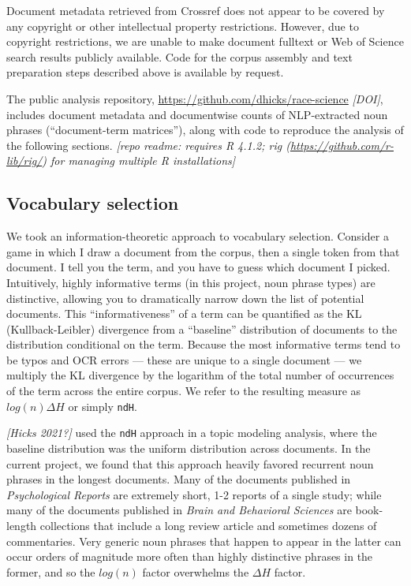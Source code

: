 \documentclass[12pt]{article}
\begin{document}
Document metadata retrieved from Crossref does not appear to be covered
by any copyright or other intellectual property restrictions. However,
due to copyright restrictions, we are unable to make document fulltext
or Web of Science search results publicly available. Code for the corpus
assembly and text preparation steps described above is available by
request.

The public analysis repository,
\url{https://github.com/dhicks/race-science} \emph{{[}DOI{]}}, includes
document metadata and documentwise counts of NLP-extracted noun phrases
(``document-term matrices''), along with code to reproduce the analysis
of the following sections. \emph{{[}repo readme: requires R 4.1.2; rig
(\url{https://github.com/r-lib/rig/}) for managing multiple R
installations{]}}

\hypertarget{vocabulary-selection}{%
\subsection*{Vocabulary selection}\label{vocabulary-selection}}

We took an information-theoretic approach to vocabulary selection.
Consider a game in which I draw a document from the corpus, then a
single token from that document. I tell you the term, and you have to
guess which document I picked. Intuitively, highly informative terms (in
this project, noun phrase types) are distinctive, allowing you to
dramatically narrow down the list of potential documents. This
``informativeness'' of a term can be quantified as the KL
(Kullback-Leibler) divergence from a ``baseline'' distribution of
documents to the distribution conditional on the term. Because the most
informative terms tend to be typos and OCR errors --- these are unique
to a single document --- we multiply the KL divergence by the logarithm
of the total number of occurrences of the term across the entire corpus.
We refer to the resulting measure as \(log(n) \Delta H\) or simply
\texttt{ndH}.

\emph{{[}Hicks 2021?{]}} used the \texttt{ndH} approach in a topic
modeling analysis, where the baseline distribution was the uniform
distribution across documents. In the current project, we found that
this approach heavily favored recurrent noun phrases in the longest
documents. Many of the documents published in \emph{Psychological
Reports} are extremely short, 1-2 reports of a single study; while many
of the documents published in \emph{Brain and Behavioral Sciences} are
book-length collections that include a long review article and sometimes
dozens of commentaries. Very generic noun phrases that happen to appear
in the latter can occur orders of magnitude more often than highly
distinctive phrases in the former, and so the \(log(n)\) factor
overwhelms the \(\Delta H\) factor.
\end{document}
